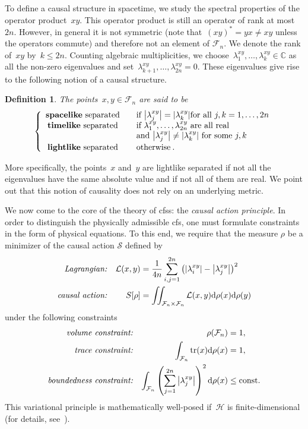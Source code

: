 \documentclass[reqno,11pt]{amsart}
\newcommand{\C}{\mathbb{C}}
\renewcommand{\H}{\mathcal{H}}
\newcommand{\F}{{\mathcal{F}}}
\renewcommand{\L}{{\mathcal{L}}}
\newtheorem{definition}{Definition}[section]
\numberwithin{equation}{section}
\begin{document}
To define a causal structure in spacetime, we study the spectral properties of the operator product~$xy$.
This operator product is still an operator of rank at most~$2n$.
However, in general it is not symmetric (note that~$(xy)^* = yx \neq xy$ unless the
operators commute) and therefore not an element of $\F_n$.
We denote the rank of~$xy$ by~$k \leq 2n$.
Counting algebraic multiplicities, we choose~$\lambda^{xy}_1, \ldots, \lambda^{xy}_{k} \in \C$ as all the non-zero eigenvalues
and set~$\lambda^{xy}_{k+1}, \ldots, \lambda^{xy}_{2n}=0$.
These eigenvalues give rise to the following notion of a causal structure.
\begin{definition}
    \label{def:causalstructure}
    The points~$x,y \in \F_n$ are said to be
    \begin{align*}
        \left\{ \begin{array}{cll}
                    \text{{\textbf{spacelike}} separated} & & \text{if } \abs{\lambda^{xy}_j} = \abs{\lambda^{xy}_k} \text{for all } j, k = 1, \ldots, 2n \\
                    \text{{\textbf{timelike}} separated} & & \text{if } \lambda^{xy}_1, \ldots, \lambda^{xy}_{2n} \text{ are all real} \\
                    & & \text{and } \abs{\lambda^{xy}_j} \neq \abs{\lambda^{xy}_k} \text{ for some } j, k  \\[0.2em]
                    \text{{\textbf{lightlike}} separated} & & \text{otherwise}\:.
        \end{array}\right.
    \end{align*}
\end{definition} \noindent
More specifically, the points~$x$ and~$y$ are lightlike
separated if not all the eigenvalues have the same absolute value and if not all of them are real.
We point out that this notion of causality does not rely on an underlying metric.

We now come to the core of the theory of \ac{cfs}s: the \textit{causal action principle}.
In order to distinguish the physically admissible \ac{cfs}, one must formulate constraints in the form of physical equations.
To this end, we require that the measure $\rho$ be a minimizer of the causal action $\mathcal{S}$ defined by
\begin{align}
    \text{\textit{Lagrangian:}} && \L(x,y) &= \frac{1}{4n} \sum_{i,j=1}^{2n} \left( \abs{\lambda^{xy}_i} - \abs{\lambda^{xy}_j} \right)^2 \label{eq:lagrangian} \\
    \text{\textit{causal action:}} && S[\rho] &= \iint_{\F_n \times \F_n} \L(x,y) \dd\rho(x) \dd\rho(y)
\end{align}
under the following constraints
\begin{align*}
    \text{\textit{volume constraint:}} && \rho(\F_n) &= 1, \\
    \text{\textit{trace constraint:}} && \int_{\F_n} \tr(x) \dd\rho(x) &= 1, \\
    \text{\textit{boundedness constraint:}} && \int_{\F_n} \left( \sum_{j=1}^{2n} \abs{\lambda^{xy}_j} \right)^2 \dd\rho(x) &\leq \text{const}.
\end{align*}
This variational principle is mathematically well-posed if~$\H$ is finite-dimensional (for details, see~\cite[Section~1.1.1]{cfs}).
\end{document}
